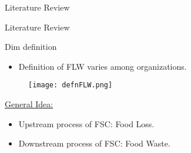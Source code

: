 \documentclass{beamer}\usepackage[]{graphicx}\usepackage[]{xcolor}
\begin{document}
\begin{frame}{Literature Review}
\end{frame}

\begin{frame}{Literature Review}
     \begin{block}{Dim definition}
        \begin{itemize}
            \item Definition of FLW varies among organizations.
        \end{itemize}
        \begin{figure}
            \centering
            \texttt{[image: defnFLW.png]}
        \end{figure}
     \end{block}
     \underline{General Idea:}
     \begin{itemize}
        \item Upstream process of FSC: Food Loss.
        \item Downstream process of FSC: Food Waste.
    \end{itemize}  
\end{frame}
\end{document}
